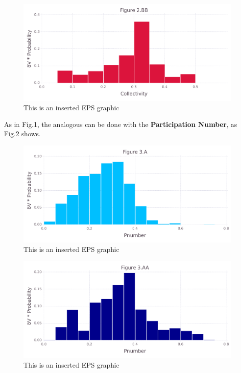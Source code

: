 \documentclass[10pt,letterpaper]{article}
\begin{document}
\begin{figure}[ht]
\begin{center}
\includegraphics[scale=0.5]{256l/2bbfigure_very_hi-precision.pdf}
\caption{This is an inserted EPS graphic}
\label{fig6}
\end{center}
\end{figure}

\clearpage
As in Fig.1, the analogous can be done with the \textbf{Participation Number}, as Fig.2 shows.

\begin{figure}[ht]
\begin{center}
\includegraphics[scale=0.5]{256l/3afigure_very_hi-precision.pdf}
\caption{This is an inserted EPS graphic}
\label{fig7}
\end{center}
\end{figure}

\begin{figure}[ht]
\begin{center}
\includegraphics[scale=0.5]{256l/3aafigure_very_hi-precision.pdf}
\caption{This is an inserted EPS graphic}
\label{fig8}
\end{center}
\end{figure}
\end{document}
